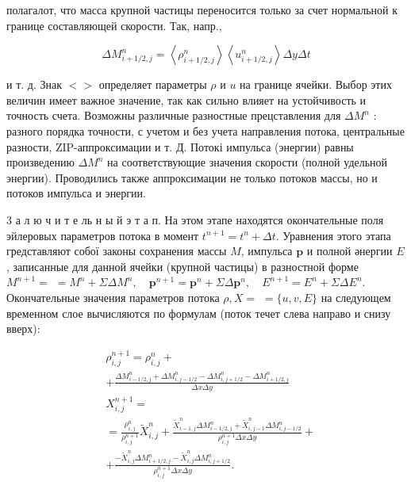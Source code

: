 \documentclass[10pt]{article}
\begin{document}
полагалот, что масса крупной частицы переносится только за счет нормальной к границе составляющей скорости. Так, напр.,



\[

\Delta M_{i+1 / 2, j}^{n}=\left\langle\rho_{i+1 / 2, j}^{n}\right\rangle\left\langle u_{i+1 / 2, j}^{n}\right\rangle \Delta y \Delta t

\]



и т. д. Знак $<>$ определяет параметры $\rho$ и $u$ на границе ячейки. Выбор этих величин имеет важное значение, так как сильно влияет на устойчивость и точность счета. Возможны различные разностные прецставления для $\Delta M^{n}$ : разного порядка точности, с учетом и без учета направления потока, центральные разности, ZIP-аппроксимации и т. Д. Потокі импульса (энергии) равны произведению $\Delta M^{n}$ на соответствующие значения скорости (полной удельной энергии). Проводились также аппроксимации не только потоков массы, но и потоков импульса и энергии.



3 а л ю ч и т е ль н ы й э т а п. На этом этапе находятся окончательные поля эйлеровых параметров потока в момент $t^{n+1}=t^{n}+\Delta t$. Уравнения этого этапа гредставляют собої законы сохранения массы $M$, импульса $\boldsymbol{p}$ и полной әнергии $E$, записанные для данной ячейки (крупной частицы) в разностной форме $M^{n+1}=$ $=M^{n}+\Sigma \Delta M^{n}, \quad \boldsymbol{p}^{n+1}=\boldsymbol{p}^{n}+\Sigma \Delta \boldsymbol{p}^{n}, \quad E^{n+1}=E^{n}+\Sigma \Delta E^{n}$. Окончательные значения параметров потока $\rho, X=$ $=\{u, v, E\}$ на следующем временном слое вычисляются по формулам (поток течет слева направо и снизу вверх):



\[

\begin{aligned}

& \rho_{i, j}^{n+1}=\rho_{i, j}^{n}+ \\

& +\frac{\Delta M_{i-1 / 2, j}^{n}+\Delta M_{i, j-1 / 2}^{n}-\Delta M_{i, j+1 / 2}^{n}-\Delta M_{i+1 / 2, j}^{n}}{\Delta x \Delta y} \\

& X_{i, j}^{n+1}= \\

& =\frac{\rho_{i, j}^{n}}{\rho_{i, j}^{n+1}} \tilde{X}_{i, j}^{n}+\frac{\tilde{X}_{i-1, j}^{n} \Delta M_{i-1 / 2, j}^{n}+\tilde{X}_{i, j-1}^{n} \Delta M_{i, j-1 / 2}^{n}}{\rho_{i, j}^{n+1} \Delta x \Delta y}+ \\

& +\frac{-\tilde{X}_{i, j}^{n} \Delta M_{i+1 / 2, j}^{n}-\tilde{X}_{i, j}^{n} \Delta M_{i, j+1 / 2}^{n}}{\rho_{i, j}^{n+1} \Delta x \Delta y} .

\end{aligned}

\]
\end{document}
